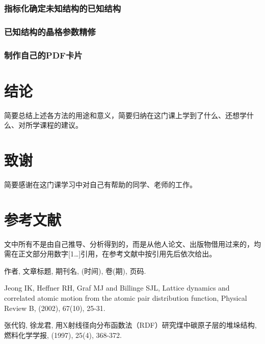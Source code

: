 \documentclass[12pt,a4paper,twoside]{ctexart}
\newcommand{\smtext}[1]{{\fontsize{9.3pt}{12pt}\selectfont #1}}
\begin{document}
\subsubsection{指标化确定未知结构的已知结构}

\subsubsection{已知结构的晶格参数精修}

\subsubsection{制作自己的PDF卡片}

\section{结\hspace{0.5em}论}

\smtext{简要总结上述各方法的用途和意义，简要归纳在这门课上学到了什么、还想学什么、对所学课程的建议。}

\section*{致\hspace{0.5em}谢}

\smtext{简要感谢在这门课学习中对自己有帮助的同学、老师的工作。}

\section*{参考文献}

\smtext{文中所有不是由自己推导、分析得到的，而是从他人论文、出版物借用过来的，均需在正文部分用数字[1…]引用，在参考文献中按引用先后依次给出。}

\smtext{作者, 文章标题, 期刊名, (时间), 卷(期), 页码.}

\smtext{[1] Jeong IK, Heffner RH, Graf MJ and Billinge SJL, Lattice dynamics and correlated atomic motion from the atomic pair distribution function, Physical Review B, (2002), 67(10), 25-31.}

{\songti\fontsize{9.3pt}{12pt}\selectfont [2] 张代钧, 徐龙君, 用X射线径向分布函数法（RDF）研究煤中碳原子层的堆垛结构, 燃料化学学报, (1997), 25(4), 368-372.\par}
\end{document}
